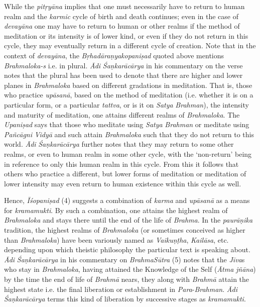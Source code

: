 While the \emph{pitṛyāna} implies that one must necessarily have to return to human realm and the \emph{karmic} cycle of birth and death continues; even in the case of \emph{devayāna} one may have to return to human or other realms if the method of meditation or its intensity is of lower kind, or even if they do not return in this cycle, they may eventually return in a different cycle of creation. Note that in the context of \emph{devayāna}, the \emph{Bṛhadāraṇyakopaniṣad} quoted above mentions \emph{Brahmaloka-s} i.e. in plural. \emph{Ādi} \emph{Śaṇkarācārya} in his commentary on the verse notes that the plural has been used to denote that there are higher and lower planes in \emph{Brahmaloka} based on different gradations in meditation. That is, those who practice \emph{upāsanā}, based on the method of meditation (i.e. whether it is on a particular form, or a particular \emph{tattva}, or is it on \emph{Satya} \emph{Brahman}), the intensity and maturity of meditation, one attains different realms of \emph{Brahmaloka}. The \emph{Upaniṣad} says that those who meditate using \emph{Satya} \emph{Brahman} or meditate using \emph{Pañcāgni} \emph{Vidyā} and such attain \emph{Brahmaloka} such that they do not return to this world. \emph{Ādi} \emph{Śaṇkarācārya} further notes that they may return to some other realms, or even to human realm in some other cycle, with the `non-return' being in reference to only this human realm in this cycle. From this it follows that others who practice a different, but lower forms of meditation or meditation of lower intensity may even return to human existence within this cycle as well.

Hence, \emph{Īśopaniṣad} (4) suggests a combination of \emph{karma} and \emph{upāsanā} as a means for \emph{kramamukti}. By such a combination, one attains the highest realm of \emph{Brahmaloka} and stays there until the end of the life of \emph{Brahma}. In the \emph{paurāṇika} tradition, the highest realms of \emph{Brahmaloka} (or sometimes conceived as higher than \emph{Brahmaloka}) have been variously named as \emph{Vaikuṇṭha}, \emph{Kailāsa}, etc. depending upon which theistic philosophy the particular text is speaking about. \emph{Ādi} \emph{Śaṇkarācārya} in his commentary on \emph{BrahmaSūtra} (5) notes that the \emph{Jīva}s who stay in \emph{Brahmaloka}, having attained the Knowledge of the Self (\emph{Ātma} \emph{jñāna}) by the time the end of life of \emph{Brahmā} nears, they along with \emph{Brahmā} attain the highest state i.e. the final liberation or establishment in \emph{Para}-\emph{Brahman}. \emph{Ādi} \emph{Śaṇkarācārya} terms this kind of liberation by successive stages as \emph{kramamukti}.

